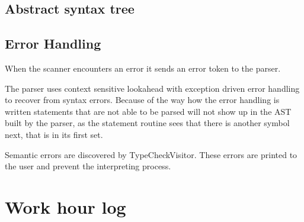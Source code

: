 \documentclass[12pt,a4paper]{article}
\begin{document}
\subsection{Abstract syntax tree}

\subsection{Error Handling}

When the scanner encounters an error it sends an error token to the parser.

The parser uses context sensitive lookahead with exception driven error
handling to recover from syntax errors. Because of the way how the error
handling is written statements that are not able to be parsed will not show up
in the AST built by the parser, as the statement routine sees that there is
another symbol next, that is in its first set.

Semantic errors are discovered by TypeCheckVisitor.
These errors are printed to the user and prevent the interpreting process.

\section{Work hour log}
\end{document}
